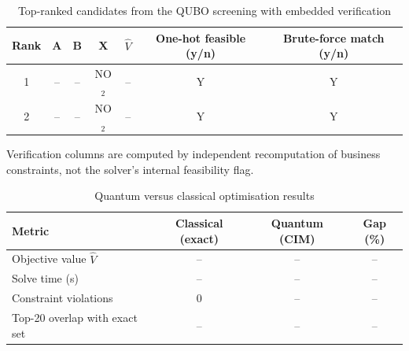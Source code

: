 
\begin{table}[htbp]
  \centering
  \caption{Top-ranked candidates from the QUBO screening with embedded verification}
  \label{tab:p2_candidates}
  \begin{tabular}{ccccccc}
    \toprule
    Rank & A & B & X & $\hat{V}$ & One-hot feasible (y/n) & Brute-force match (y/n) \\
    \midrule
    1 & -- & -- & NO$_2$ & -- & Y & Y \\
    2 & -- & -- & NO$_2$ & -- & Y & Y \\
    \bottomrule
  \end{tabular}
  \begin{minipage}{\linewidth}\vspace{2pt}\footnotesize
    Verification columns are computed by independent recomputation of business constraints,
    not the solver's internal feasibility flag.
  \end{minipage}
\end{table}

\begin{table}[htbp]
  \centering
  \caption{Quantum versus classical optimisation results}
  \label{tab:quantum_vs_classical}
  \begin{tabular}{lccc}
    \toprule
    Metric & Classical (exact) & Quantum (CIM) & Gap (\%) \\
    \midrule
    Objective value $\hat V$       & -- & -- & -- \\
    Solve time (s)                 & -- & -- & -- \\
    Constraint violations          & 0  & -- & -- \\
    Top-20 overlap with exact set  & -- & -- & -- \\
    \bottomrule
  \end{tabular}
\end{table}

